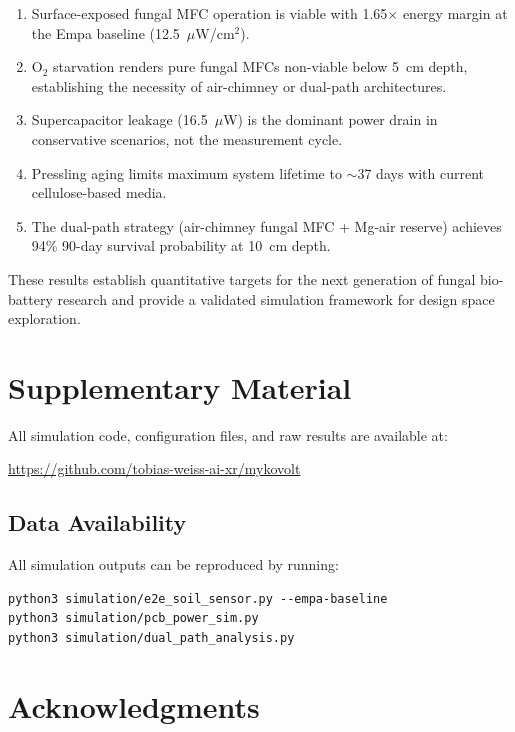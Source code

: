\documentclass[twocolumn,10pt,a4paper]{article}
\begin{document}
\begin{enumerate}
    \item Surface-exposed fungal MFC operation is viable with 1.65$\times$
          energy margin at the Empa baseline (12.5~$\mu$W/cm$^2$).
    \item O$_2$ starvation renders pure fungal MFCs non-viable below 5~cm
          depth, establishing the necessity of air-chimney or dual-path
          architectures.
    \item Supercapacitor leakage (16.5~$\mu$W) is the dominant power drain
          in conservative scenarios, not the measurement cycle.
    \item Pressling aging limits maximum system lifetime to $\sim$37 days
          with current cellulose-based media.
    \item The dual-path strategy (air-chimney fungal MFC + Mg-air reserve)
          achieves 94\% 90-day survival probability at 10~cm depth.
\end{enumerate}

These results establish quantitative targets for the next generation of
fungal bio-battery research and provide a validated simulation framework
for design space exploration.

\section*{Supplementary Material}

All simulation code, configuration files, and raw results are available at:
\begin{center}
\url{https://github.com/tobias-weiss-ai-xr/mykovolt}
\end{center}

\subsection*{Data Availability}
All simulation outputs can be reproduced by running:
\begin{verbatim}
python3 simulation/e2e_soil_sensor.py --empa-baseline
python3 simulation/pcb_power_sim.py
python3 simulation/dual_path_analysis.py
\end{verbatim}

\section*{Acknowledgments}
\end{document}
